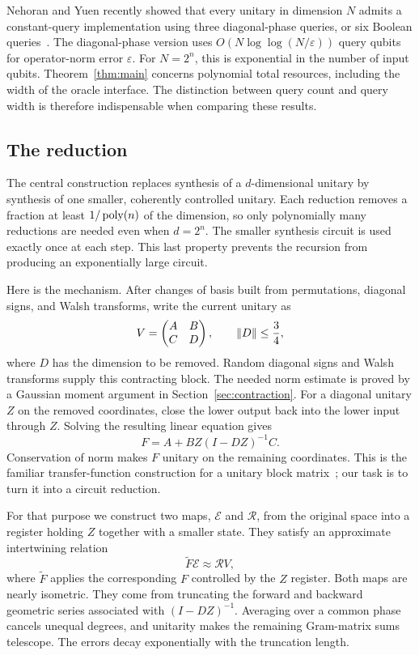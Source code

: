 Nehoran and Yuen recently showed that every unitary in dimension $N$ admits a
constant-query implementation using three diagonal-phase queries, or six
Boolean queries~\cite{NY2026}.  The diagonal-phase version uses
$O(N\log\log(N/\varepsilon))$ query qubits for operator-norm error
$\varepsilon$.  For $N=2^n$, this is exponential
in the number of input qubits.  Theorem~\ref{thm:main} concerns polynomial
total resources, including the width of the oracle interface.  The distinction
between query count and query width is therefore indispensable when comparing
these results.

\subsection{The reduction}
The central construction replaces synthesis of a $d$-dimensional unitary by
synthesis of one smaller, coherently controlled unitary.  Each reduction
removes a fraction at least $1/\operatorname{poly}(n)$ of the dimension, so only polynomially
many reductions are needed even when $d=2^n$.  The smaller synthesis circuit is
used exactly once at each step.  This last property prevents the recursion
from producing an exponentially large circuit.

Here is the mechanism.  After changes of basis built from permutations, diagonal signs, and Walsh
transforms, write the current unitary as
\[
 V=\begin{pmatrix}A&B\\C&D\end{pmatrix},\qquad \lVert D\rVert\le\frac34,
\]
where $D$ has the dimension to be removed.  Random diagonal signs and Walsh
transforms supply this contracting block.  The needed norm estimate is proved
by a Gaussian moment argument in Section~\ref{sec:contraction}.
For a diagonal unitary $Z$ on the removed coordinates, close the lower output
back into the lower input through $Z$.  Solving the resulting linear equation
gives
\[
 F=A+BZ(I-DZ)^{-1}C.
\]
Conservation of norm makes $F$ unitary on the remaining coordinates.  This is
the familiar transfer-function construction for a unitary block
matrix~\cite{FKK2009}; our task is to turn it into a circuit reduction.

For that purpose we construct two maps, $\mathcal E$ and $\mathcal R$, from
the original space into a register holding $Z$ together with a smaller state.
They satisfy an approximate intertwining relation
\[
 \widetilde F\mathcal E\approx\mathcal R V,
\]
where $\widetilde F$ applies the corresponding $F$ controlled by the $Z$
register.  Both maps are nearly isometric.  They come from truncating the
forward and backward geometric series associated with $(I-DZ)^{-1}$.
Averaging over a common phase cancels unequal degrees, and unitarity makes
the remaining Gram-matrix sums telescope.  The errors decay exponentially
with the truncation length.

